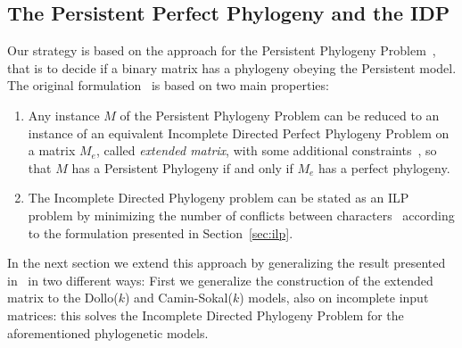 \documentclass[a4paper,USenglish]{article}
\theoremstyle{definition}
\begin{document}
\subsection{The Persistent Perfect Phylogeny and the IDP}
\label{sec:persistent-idp}
Our    strategy   is    based   on    the   approach for the Persistent Phylogeny 
  Problem~\cite{gusfield_persistent_2015}, that is  to decide if a binary matrix  has a
  phylogeny obeying the Persistent model.  
  The original formulation~\cite{gusfield_persistent_2015} is based on 
  two main  properties:
  \begin{enumerate}
  \item \label{item:1} Any instance $M$ of the Persistent Phylogeny
   Problem can be reduced to an instance of an equivalent Incomplete Directed Perfect
    Phylogeny Problem on a matrix $M_e$, called
    \emph{extended       matrix},      with       some      additional
    constraints~\cite{BonizzoniBDT12}, 
    so that $M$ has a Persistent Phylogeny if and only if $M_{e}$ has a perfect phylogeny.
   \item \label{item:2} The Incomplete Directed Phylogeny problem can be stated 
      as an ILP problem by minimizing the number of conflicts between 
      characters~\cite{Gusfield2007} according  to the formulation  presented in
      Section~\ref{sec:ilp}.
  \end{enumerate}

In the next section we extend this approach by generalizing the result
  presented in~\cite{BonizzoniBDT12} in two different ways:
First
  we generalize the construction of the extended matrix to the Dollo($k$)
  and Camin-Sokal($k$) models, also on incomplete  input matrices: this solves the
  Incomplete  Directed  Phylogeny Problem  for the  aforementioned 
  phylogenetic models.


\end{document}
